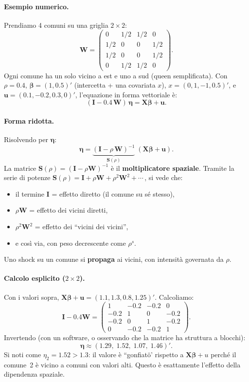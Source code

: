 \documentclass[12pt,a4paper]{article}
\newcommand{\bW}{\mathbf{W}}
\newcommand{\bX}{\mathbf{X}}
\newcommand{\bu}{\mathbf{u}}
\newcommand{\bI}{\mathbf{I}}
\newcommand{\bS}{\mathbf{S}}
\begin{document}
\paragraph{Esempio numerico.}
Prendiamo 4 comuni su una griglia $2 \times 2$:
\[
\bW = \begin{pmatrix}
  0 & 1/2 & 1/2 & 0 \\
  1/2 & 0 & 0 & 1/2 \\
  1/2 & 0 & 0 & 1/2 \\
  0 & 1/2 & 1/2 & 0
\end{pmatrix}.
\]
Ogni comune ha un solo vicino a est e uno a sud (queen semplificata). Con $\rho = 0.4$, $\boldsymbol{\beta} = (1, 0.5)'$ (intercetta + una covariata $x$), $x = (0, 1, -1, 0.5)'$, e $\bu = (0.1, -0.2, 0.3, 0)'$, l'equazione in forma vettoriale \`e:
\[
  (\bI - 0.4\,\bW)\,\boldsymbol{\eta} = \bX\boldsymbol{\beta} + \bu.
\]

\paragraph{Forma ridotta.}
Risolvendo per $\boldsymbol{\eta}$:
\begin{equation}\label{eq:reduced}
  \boldsymbol{\eta} = \underbrace{(\bI - \rho\,\bW)^{-1}}_{\bS(\rho)}\;(\bX\boldsymbol{\beta} + \bu).
\end{equation}
La matrice $\bS(\rho) = (\bI - \rho\bW)^{-1}$ \`e il \textbf{moltiplicatore spaziale}. Tramite la serie di potenze $\bS(\rho) = \bI + \rho\bW + \rho^2\bW^2 + \cdots$\,, si vede che:
\begin{itemize}
  \item il termine $\bI$ = effetto diretto (il comune su s\'e stesso),
  \item $\rho\bW$ = effetto dei vicini diretti,
  \item $\rho^2\bW^2$ = effetto dei ``vicini dei vicini'',
  \item e cos\`i via, con peso decrescente come $\rho^s$.
\end{itemize}
Uno shock su un comune si \textbf{propaga} ai vicini, con intensit\`a governata da $\rho$.

\paragraph{Calcolo esplicito ($2 \times 2$).}
Con i valori sopra, $\bX\boldsymbol{\beta} + \bu = (1.1, 1.3, 0.8, 1.25)'$. Calcoliamo:
\[
\bI - 0.4\bW = \begin{pmatrix}
  1 & -0.2 & -0.2 & 0 \\
  -0.2 & 1 & 0 & -0.2 \\
  -0.2 & 0 & 1 & -0.2 \\
  0 & -0.2 & -0.2 & 1
\end{pmatrix}.
\]
Invertendo (con un software, o osservando che la matrice ha struttura a blocchi):
\[
\boldsymbol{\eta} \approx (1.29,\; 1.52,\; 1.07,\; 1.46)'.
\]
Si noti come $\eta_2 = 1.52 > 1.3$: il valore \`e ``gonfiatö' rispetto a $\bX\boldsymbol{\beta} + u$ perch\'e il comune~2 \`e vicino a comuni con valori alti. Questo \`e esattamente l'effetto della dipendenza spaziale.
\end{document}
